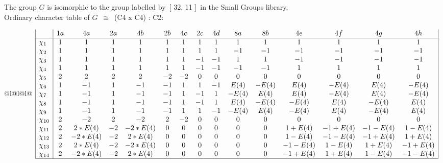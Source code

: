 \documentclass[varwidth=\maxdimen,border=10]{standalone}
\begin{document}
The group $G$ is isomorphic to the group labelled by\ [ 32, 11 ]\ in the Small Groups library.\\
Ordinary character table of $G$\ $\cong$\ (C4 x C4) : C2:\\
\begin{center}
\begin{tabular}{@{}l@{}l@{}l@{}}
\hline
\(\begin{array}{|l|cccccccccccccc|}
  & 1a & 4a & 2a & 4b & 2b & 4c & 2c & 4d & 8a & 8b & 4e & 4f & 4g & 4h\\ \hline
\chi_{1} & 1 & 1 & 1 & 1 & 1 & 1 & 1 & 1 & 1 & 1 & 1 & 1 & 1 & 1\\
\chi_{2} & 1 & 1 & 1 & 1 & 1 & 1 & 1 & 1 & -1 & -1 & -1 & -1 & -1 & -1\\
\chi_{3} & 1 & 1 & 1 & 1 & 1 & 1 & -1 & -1 & 1 & 1 & -1 & -1 & -1 & -1\\
\chi_{4} & 1 & 1 & 1 & 1 & 1 & 1 & -1 & -1 & -1 & -1 & 1 & 1 & 1 & 1\\
\chi_{5} & 2 & 2 & 2 & 2 & -2 & -2 & 0 & 0 & 0 & 0 & 0 & 0 & 0 & 0\\
\chi_{6} & 1 & -1 & 1 & -1 & -1 & 1 & 1 & -1 & E(4) & -E(4) & E(4) & -E(4) & E(4) & -E(4)\\
\chi_{7} & 1 & -1 & 1 & -1 & -1 & 1 & -1 & 1 & -E(4) & E(4) & E(4) & -E(4) & E(4) & -E(4)\\
\chi_{8} & 1 & -1 & 1 & -1 & -1 & 1 & -1 & 1 & E(4) & -E(4) & -E(4) & E(4) & -E(4) & E(4)\\
\chi_{9} & 1 & -1 & 1 & -1 & -1 & 1 & 1 & -1 & -E(4) & E(4) & -E(4) & E(4) & -E(4) & E(4)\\
\chi_{10} & 2 & -2 & 2 & -2 & 2 & -2 & 0 & 0 & 0 & 0 & 0 & 0 & 0 & 0\\
\chi_{11} & 2 & 2*E(4) & -2 & -2*E(4) & 0 & 0 & 0 & 0 & 0 & 0 & 1+E(4) & -1+E(4) & -1-E(4) & 1-E(4)\\
\chi_{12} & 2 & -2*E(4) & -2 & 2*E(4) & 0 & 0 & 0 & 0 & 0 & 0 & 1-E(4) & -1-E(4) & -1+E(4) & 1+E(4)\\
\chi_{13} & 2 & 2*E(4) & -2 & -2*E(4) & 0 & 0 & 0 & 0 & 0 & 0 & -1-E(4) & 1-E(4) & 1+E(4) & -1+E(4)\\
\chi_{14} & 2 & -2*E(4) & -2 & 2*E(4) & 0 & 0 & 0 & 0 & 0 & 0 & -1+E(4) & 1+E(4) & 1-E(4) & -1-E(4)\\
\hline
\end{array}\)\\
\end{tabular}
\end{center}
\end{document}
